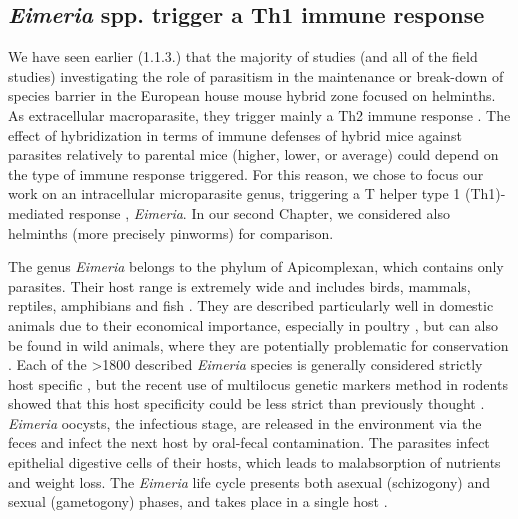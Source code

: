 \subsection{\textit{Eimeria} spp. trigger a Th1 immune response}
We have seen earlier (1.1.3.) that the majority of studies (and all of the field studies) investigating the role of parasitism in the maintenance or break-down of species barrier in the European house mouse hybrid zone focused on helminths. As extracellular macroparasite, they trigger mainly a Th2 immune response \citep{sher_regulation_1992}. The effect of hybridization in terms of immune defenses of hybrid mice against parasites relatively to parental mice (higher, lower, or average) could depend on the type of immune response triggered. For this reason, we chose to focus our work on an intracellular microparasite genus, triggering a T helper type 1 (Th1)-mediated response \citep{sher_regulation_1992}, \textit{Eimeria}. In our second Chapter, we considered also helminths (more precisely pinworms) for comparison.
\par
The genus \textit{Eimeria} belongs to the phylum of Apicomplexan, which contains only parasites. Their host range is extremely wide and includes birds, mammals, reptiles, amphibians and fish \citep{chapman_chapter_2013}. They are described particularly well in domestic animals due to their economical importance, especially in poultry \citep{blake_securing_2014}, but can also be found in wild animals, where they are potentially problematic for conservation \parencite{jeanes_two_2013, knowles_stability_2013, matsubayashi_molecular_2018}. Each of the >1800 described \textit{Eimeria} species is generally considered strictly host specific \citep{duszynski_eimeria_2011}, but the recent use of multilocus genetic markers method in rodents showed that this host specificity could be less strict than previously thought \citep{jarquin-diaz_generalist_2020}. \textit{Eimeria} oocysts, the infectious stage, are released in the environment via the feces and infect the next host by oral-fecal contamination. The parasites infect epithelial digestive cells of their hosts, which leads to malabsorption of nutrients and weight loss. The \textit{Eimeria} life cycle presents both asexual (schizogony) and sexual (gametogony) phases, and takes place in a single host \citep{burrell_life_2019}.
\par
